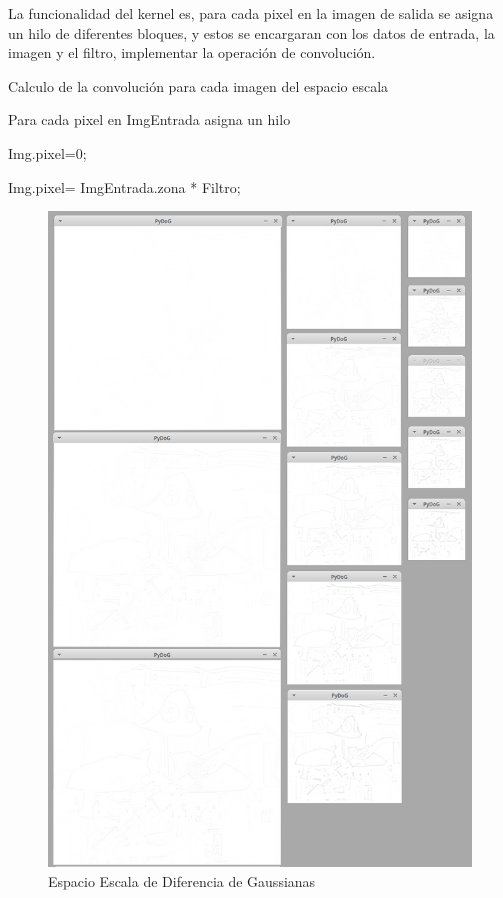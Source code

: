 La funcionalidad del kernel es, para cada pixel en la imagen de salida se asigna un hilo de diferentes bloques, y estos se encargaran con los datos de entrada, la imagen y el filtro, implementar la operación de convolución.\\

\begin{algorithm}[H]
\caption{Calculo de la convolución para cada imagen del espacio escala}
 Para cada pixel en ImgEntrada asigna un hilo\;
 
 {
	{
		Img.pixel=0;
	}{
		
		Img.pixel= ImgEntrada.zona * Filtro; 
		\\
		}
 }
	

\end{algorithm}
\begin{figure}[ph]
			\centering
				\includegraphics[scale=0.45]{img/pyDoGT.jpg}
			\caption{Espacio Escala de Diferencia de Gaussianas}
\end{figure}


